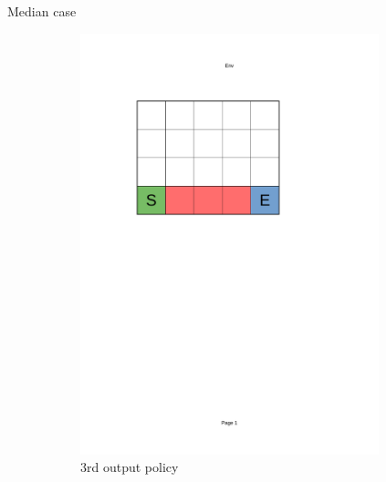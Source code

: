 \documentclass[10pt]{beamer}
\begin{document}
\begin{frame}{Median case}
\begin{figure}[!ht]
\begin{subfigure}{0.24\textwidth}
                \includegraphics[page=9, trim = 40mm 160mm 70mm 45mm, clip, width=0.95\textwidth]{figures/personal_work/policies.pdf}
            \caption{3rd output policy}
        \end{subfigure}
        \begin{subfigure}{0.24\textwidth}
            \centering

\end{subfigure}
\end{figure}
\end{frame}
\end{document}
